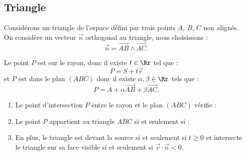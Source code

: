 \documentclass[11pt,class=report,crop=false]{standalone}
\begin{document}
\subsection{Triangle}

Considérons un triangle de l'espace défini par trois points $A$, $B$, $C$ non alignés.
On considère un vecteur $\vec n$ orthogonal au triangle, nous choisissons :
$$\vec n = \overrightarrow{AB} \wedge\overrightarrow{AC}.$$ 



Le point $P$ est sur le rayon, donc il existe $t \in \Rr$ tel que :
$$P = S + t \vec v$$
et $P$ est dans le plan $(ABC)$ donc il existe $\alpha,\beta \in \Rr$ tels que :
$$P = A + \alpha \overrightarrow{AB} + \beta \overrightarrow{AC}.$$


\begin{proposition}
\sauteligne
\begin{enumerate}
  \item Le point d'intersection $P$ entre le rayon et le plan $(ABC)$ vérifie :

  \item Le point $P$ appartient au triangle $ABC$ si et seulement si :

  \item En plus, le triangle est devant la source si et seulement si $t \ge 0$ et intersecte le triangle sur sa face visible si et seulement si $\vec v \cdot \vec n < 0$.
\end{enumerate}
\end{proposition}
\end{document}
